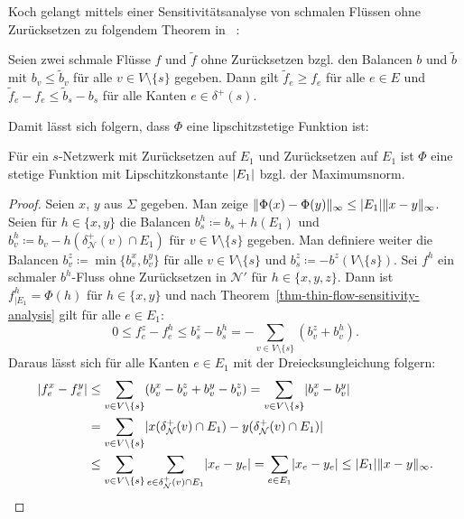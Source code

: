 Koch gelangt mittels einer Sensitivitätsanalyse von schmalen Flüssen ohne Zurück\-setzen zu folgendem Theorem in ~\cite[Theorem 6.53]{Koch2012}:
\begin{theorem}\label{thm-thin-flow-sensitivity-analysis}
	Seien zwei schmale Flüsse $f$ und $\tilde{f}$ ohne Zurücksetzen bzgl. den Balancen $b$ und $\tilde{b}$ mit $b_v \leq \tilde{b}_v$ für alle $v\in V \setminus \{ s \}$ gegeben.
	Dann gilt $\tilde{f}_e \geq f_e$ für alle $e\in E$ und $\tilde{f}_e - f_e \leq \tilde{b}_s - b_s$ für alle Kanten $e\in\delta^+(s)$.
\end{theorem}

Damit lässt sich folgern, dass $\Phi$ eine lipschitzstetige Funktion ist:
\begin{corollary}
	Für ein $s$-Netzwerk mit Zurücksetzen auf $E_1$ und Zurücksetzen auf $E_1$ ist $\Phi$ eine stetige Funktion mit Lipschitzkonstante $\lvert E_1\rvert$ bzgl. der Maximumsnorm.
\end{corollary}
\begin{proof}
	Seien $x$, $y$ aus $\Sigma$ gegeben.
	Man zeige $\lVert\Phi(x) - \Phi(y)\rVert_\infty \leq \lvert E_1\rvert \lVert x- y\rVert_\infty $.
	Seien für $h\in \{ x,y \}$ die Balancen $b_s^h \coloneq b_s + h(E_1)$ und $b_v^h\coloneq b_v - h(\delta^+_\mathcal{N}(v) \cap E_1)$ für $v\in V\setminus\{ s\}$ gegeben.
	Man definiere weiter die Balancen $b_v^z \coloneq \min \{ b_v^x, b_v^y \}$ für alle $v\in V\setminus \{ s\}$ und $b_s^z\coloneq -b^z(V\setminus \{ s\})$.
	Sei $f^h$ ein schmaler $b^h$-Fluss ohne Zurücksetzen in $\mathcal{N}'$ für $h\in \{x, y, z\}$.
	Dann ist $f^h_{\mid E_1} = \Phi(h)$ für $h\in \{x,y \}$ und nach Theorem~\ref{thm-thin-flow-sensitivity-analysis} gilt für alle $e\in E_1$:
	\[
		0\leq f_e^z - f_e^h \leq b_s^z - b_s^h = - \sum_{v\in V\setminus\{ s\}} (b_v^z + b_v^h).
	\]
	Daraus lässt sich für alle Kanten $e\in E_1$ mit der Dreiecksungleichung folgern:
	\setlength{\belowdisplayskip}{0em}
	\begin{align*}
		\lvert f_e^x - f_e^y\rvert &\leq \sum_{v\in V\setminus\{s \}} (b_v^x - b_v^z + b_v^y - b_v^z) = \sum_{v\in V\setminus\{s\}} \lvert b_v^x - b_v^y\rvert\\
		& = \sum_{v\in V\setminus\{s\}} \lvert x(\delta^+_\mathcal{N}(v) \cap E_1) - y(\delta^+_\mathcal{N}(v) \cap E_1)\rvert \\
		&\leq \sum_{v\in V\setminus\{ s\}} \sum_{e\in\delta^+_\mathcal{N}(v)\cap E_1} \lvert x_e - y_e\rvert = \sum_{e\in E_1} \lvert x_e - y_e\rvert \leq \lvert E_1\rvert \lVert x-y\rVert_\infty.
	\end{align*}
\end{proof}

